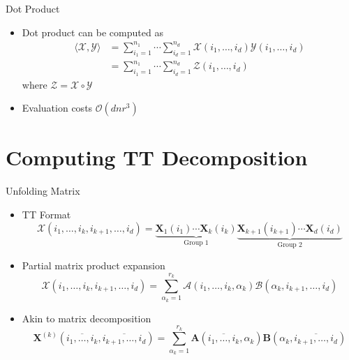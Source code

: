 \documentclass[aspectratio=169]{beamer}
\newcommand{\Mat}[1]{\mathbf{#1}}
\newcommand{\Tns}[1]{\mathcal{#1}}
\newcommand{\Ord}{\mathcal{O}}
\begin{document}
\begin{frame}{Dot Product}
  \begin{itemize}
    \item
      Dot product can be computed as
      \begin{equation*}
        \begin{split}
          \langle \Tns{X}, \Tns{Y} \rangle
          &= \sum_{i_1 = 1}^{n_1} \cdots \sum_{i_d = 1}^{n_d} \Tns{X}(i_1,
          \ldots, i_d) \Tns{Y}(i_1, \ldots, i_d) \\
          &= \sum_{i_1 = 1}^{n_1} \cdots \sum_{i_d = 1}^{n_d} \Tns{Z}(i_1,
          \ldots, i_d)
        \end{split}
      \end{equation*}
      where $\Tns{Z} = \Tns{X} \circ \Tns{Y}$
    \item
      Evaluation costs $\Ord(d n r^3)$
  \end{itemize}
\end{frame}

\section{Computing TT Decomposition}

\begin{frame}{Unfolding Matrix}
  \begin{itemize}
    \item
      TT Format
      \begin{equation*}
        \Tns{X}(i_1, \ldots, i_k, i_{k + 1}, \ldots, i_d) =
        \underbrace{\Mat{X}_1(i_1) \cdots \Mat{X}_k(i_k)}_{\text{Group 1}}
        \underbrace{\Mat{X}_{k + 1}(i_{k + 1}) \cdots
        \Mat{X}_d(i_d)}_{\text{Group 2}}
      \end{equation*}
    \item
      Partial matrix product expansion
      \begin{equation*}
        \Tns{X}(i_1, \ldots, i_k, i_{k + 1}, \ldots, i_d) = \sum_{\alpha_k =
        1}^{r_k} \Tns{A}(i_1, \ldots, i_k, \alpha_k) \Tns{B}(\alpha_k, i_{k +
        1}, \ldots, i_d)
      \end{equation*}
    \item
      Akin to matrix decomposition
      \begin{equation*}
        \Mat{X}^{(k)}(\overline{i_1, \ldots, i_k}, \overline{i_{k + 1}, \ldots,
        i_d}) = \sum_{\alpha_k = 1}^{r_k} \Mat{A}(\overline{i_1, \ldots, i_k},
        \alpha_k) \Mat{B}(\alpha_k, \overline{i_{k + 1}, \ldots, i_d})
      \end{equation*}
  \end{itemize}
\end{frame}
\end{document}

